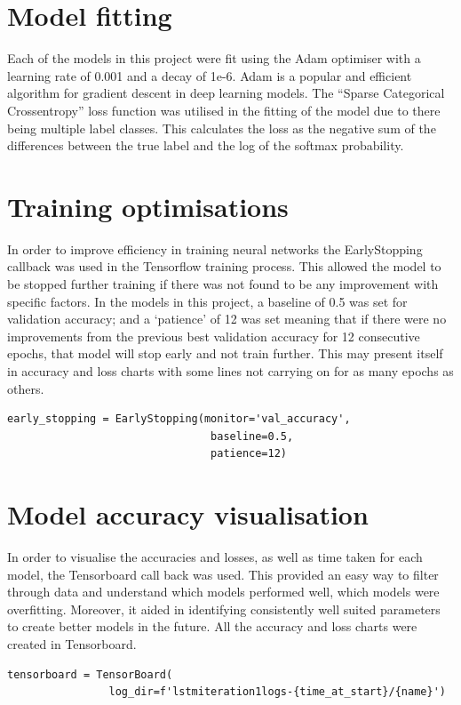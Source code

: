 \section{Model fitting}\label{sec:model_fitting}
Each of the models in this project were fit using the Adam optimiser with a learning rate of 0.001 and a decay of
1e-6. Adam is a popular and efficient algorithm for gradient descent in deep learning models.
The ``Sparse Categorical Crossentropy'' loss function was utilised in the fitting of the model due to there being multiple
label classes. This calculates the loss as the negative sum of the differences between the true label and the log of the softmax
probability.

\section{Training optimisations}
In order to improve efficiency in training neural networks the EarlyStopping callback was used in the
Tensorflow training process. This allowed the model to be stopped further training if there was not
found to be any improvement with specific factors. In the models in this project, a baseline of 0.5
was set for validation accuracy; and a `patience' of 12 was set meaning that if there were no
improvements from the previous best validation accuracy for 12 consecutive epochs, that model will
stop early and not train further. This may present itself in accuracy and loss charts with some lines
not carrying on for as many epochs as others.

\begin{verbatim}
early_stopping = EarlyStopping(monitor='val_accuracy', 
                                baseline=0.5,
                                patience=12)
\end{verbatim}

\section{Model accuracy visualisation}
In order to visualise the accuracies and losses, as well as time taken for each model, the Tensorboard
call back was used. This provided an easy way to filter through data and understand which models performed
well, which models were overfitting. Moreover, it aided in identifying consistently well suited parameters
to create better models in the future. All the accuracy and loss charts were created in Tensorboard.

\begin{verbatim}
tensorboard = TensorBoard(
                log_dir=f'lstmiteration1logs-{time_at_start}/{name}')
\end{verbatim}

